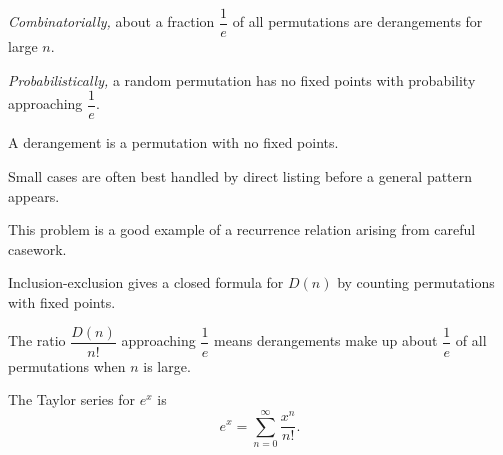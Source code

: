 \begin{takeaways}
\item \textit{Combinatorially,} about a fraction $\dfrac1e$ of all permutations are derangements for large $n$.
\item \textit{Probabilistically,} a random permutation has no fixed points with probability approaching $\dfrac1e$.
\item A derangement is a permutation with no fixed points.
\item Small cases are often best handled by direct listing before a general pattern appears.
\item This problem is a good example of a recurrence relation arising from careful casework.
\item Inclusion-exclusion gives a closed formula for $D(n)$ by counting permutations with fixed points.
\item The ratio $\dfrac{D(n)}{n!}$ approaching $\dfrac1e$ means derangements make up about $\dfrac1e$ of all permutations when $n$ is large.

\item The Taylor series for $e^x$ is
\[
e^{x}= \sum_{n=0}^{\infty} \frac{x^n}{n!}.
\]

\end{takeaways}

